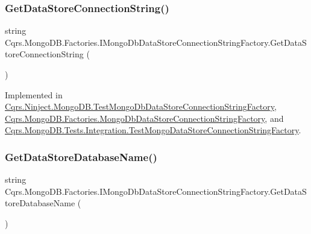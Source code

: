 \subsubsection{\texorpdfstring{Get\+Data\+Store\+Connection\+String()}{GetDataStoreConnectionString()}}
{\footnotesize\ttfamily string Cqrs.\+Mongo\+D\+B.\+Factories.\+I\+Mongo\+Db\+Data\+Store\+Connection\+String\+Factory.\+Get\+Data\+Store\+Connection\+String (\begin{DoxyParamCaption}{ }\end{DoxyParamCaption})}



Implemented in \hyperlink{classCqrs_1_1Ninject_1_1MongoDB_1_1TestMongoDbDataStoreConnectionStringFactory_abc9f81219c65af4182635cd545282b65_abc9f81219c65af4182635cd545282b65}{Cqrs.\+Ninject.\+Mongo\+D\+B.\+Test\+Mongo\+Db\+Data\+Store\+Connection\+String\+Factory}, \hyperlink{classCqrs_1_1MongoDB_1_1Factories_1_1MongoDbDataStoreConnectionStringFactory_a76986fcc9521c87bfbb6e417ef13cd53_a76986fcc9521c87bfbb6e417ef13cd53}{Cqrs.\+Mongo\+D\+B.\+Factories.\+Mongo\+Db\+Data\+Store\+Connection\+String\+Factory}, and \hyperlink{classCqrs_1_1MongoDB_1_1Tests_1_1Integration_1_1TestMongoDataStoreConnectionStringFactory_a520a0722aa91ed6144e4e86213ea13da_a520a0722aa91ed6144e4e86213ea13da}{Cqrs.\+Mongo\+D\+B.\+Tests.\+Integration.\+Test\+Mongo\+Data\+Store\+Connection\+String\+Factory}.

\mbox{\label{interfaceCqrs_1_1MongoDB_1_1Factories_1_1IMongoDbDataStoreConnectionStringFactory_aca9921fae4214a9eb22a221825c57363_aca9921fae4214a9eb22a221825c57363}} 
\subsubsection{\texorpdfstring{Get\+Data\+Store\+Database\+Name()}{GetDataStoreDatabaseName()}}
{\footnotesize\ttfamily string Cqrs.\+Mongo\+D\+B.\+Factories.\+I\+Mongo\+Db\+Data\+Store\+Connection\+String\+Factory.\+Get\+Data\+Store\+Database\+Name (\begin{DoxyParamCaption}{ }\end{DoxyParamCaption})}



